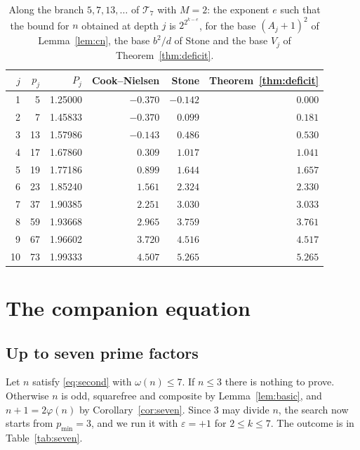 \documentclass[screen,reqno]{aomart}
\numberwithin{equation}{section}
\theoremstyle{plain}
\theoremstyle{definition}
\theoremstyle{remark}
\begin{document}
\begin{table}[ht]
\centering
\caption{Along the branch $5,7,13,\dots$ of $\mathcal T_7$ with
$M=2$: the exponent $e$ such that the bound for $n$ obtained at depth
$j$ is $2^{2^{k-e}}$, for the base $(A_j+1)^2$ of Lemma~\ref{lem:cn},
the base $b^2/d$ of Stone and the base $V_j$ of
Theorem~\ref{thm:deficit}.}
\label{tab:bases}
\smallskip
\small
\begin{tabular}{@{}rrrrrr@{}}
\toprule
$j$ & $p_j$ & $P_j$ & Cook--Nielsen & Stone & Theorem~\ref{thm:deficit}\\
\midrule
1 & 5 & 1.25000 & $-0.370$ & $-0.142$ & $0.000$\\
2 & 7 & 1.45833 & $-0.370$ & $0.099$ & $0.181$\\
3 & 13 & 1.57986 & $-0.143$ & $0.486$ & $0.530$\\
4 & 17 & 1.67860 & $0.309$ & $1.017$ & $1.041$\\
5 & 19 & 1.77186 & $0.899$ & $1.644$ & $1.657$\\
6 & 23 & 1.85240 & $1.561$ & $2.324$ & $2.330$\\
7 & 37 & 1.90385 & $2.251$ & $3.030$ & $3.033$\\
8 & 59 & 1.93668 & $2.965$ & $3.759$ & $3.761$\\
9 & 67 & 1.96602 & $3.720$ & $4.516$ & $4.517$\\
10 & 73 & 1.99333 & $4.507$ & $5.265$ & $5.265$\\
\bottomrule
\end{tabular}
\end{table}

\section{The companion equation}\label{sec:second}

\subsection{Up to seven prime factors}\label{sec:seven}
Let $n$ satisfy \eqref{eq:second} with $\omega(n)\le7$. If $n\le3$
there is nothing to prove. Otherwise $n$ is odd, squarefree and
composite by Lemma~\ref{lem:basic}, and $n+1=2\varphi(n)$ by
Corollary~\ref{cor:seven}. Since $3$ may divide $n$, the search now
starts from $p_{\min}=3$, and we run it with $\varepsilon=+1$ for
$2\le k\le7$. The outcome is in Table~\ref{tab:seven}.
\end{document}
